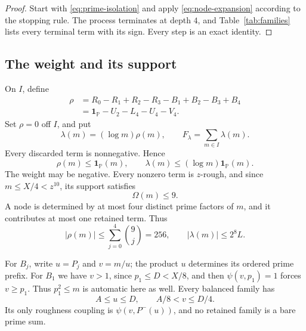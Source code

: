 \documentclass{amsart}
\newcounter{fact}
\numberwithin{equation}{section}
\numberwithin{table}{section}
\newcommand{\PP}{\mathbb P}
\newcommand{\ind}{\mathbf 1}
\begin{document}
\begin{proof}
Start with \eqref{eq:prime-isolation} and apply \eqref{eq:node-expansion}
according to the stopping rule. The process terminates at depth $4$, and
Table~\ref{tab:families} lists every terminal term with its sign.
Every step is an exact identity.
\end{proof}

\subsection{The weight and its support}

On $I$, define
\begin{equation}\label{eq:rho-definition}
\begin{split}
\rho&=R_0-R_1+R_2-R_3-B_1+B_2-B_3+B_4\\
&=\ind_{\PP}-U_2-L_4-U_4-V_4.
\end{split}
\end{equation}
Set $\rho=0$ off $I$, and put
\begin{equation}\label{eq:lambda-definition}
\lambda(m)=(\log m)\rho(m),\qquad
F_\lambda=\sum_{m\in I}\lambda(m).
\end{equation}
Every discarded term is nonnegative. Hence
\begin{equation}\label{eq:pointwise-minorant}
\rho(m)\le\ind_{\PP}(m),\qquad
\lambda(m)\le(\log m)\ind_{\PP}(m).
\end{equation}
The weight may be negative. Every nonzero term is $z$-rough, and since
$m\le X/4<z^{10}$, its support satisfies
\begin{equation}\label{eq:Omega-nine}
\Omega(m)\le9.
\end{equation}
A node is determined by at most four distinct prime factors of $m$, and
it contributes at most one retained term. Thus
\begin{equation}\label{eq:weight-sup}
|\rho(m)|\le\sum_{j=0}^4\binom9j=256,
\qquad |\lambda(m)|\le2^8L.
\end{equation}

For $B_j$, write $u=P_j$ and $v=m/u$; the product $u$ determines its
ordered prime prefix. For $B_1$ we have $v>1$, since $p_1\le D<X/8$, and
then $\psi(v,p_1)=1$ forces $v\ge p_1$. Thus $p_1^2\le m$ is automatic
here as well.
Every balanced family has
\begin{equation}\label{eq:balanced-window}
A\le u\le D,\qquad A/8<v\le D/4.
\end{equation}
Its only roughness coupling is $\psi(v,P^-(u))$, and no retained family
is a bare prime sum.
\end{document}
